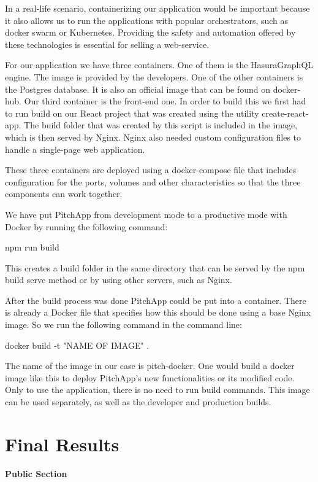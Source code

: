In a real-life scenario, containerizing our application would be important because it also allows us to run the applications with popular orchestrators, such as docker swarm or Kubernetes. Providing the safety and automation offered by these technologies is essential for selling a web-service.

For our application we have three containers. One of them is the HasuraGraphQL engine. The image is provided by the developers. One of the other containers is the Postgres database. It is also an official image that can be found on docker-hub. Our third container is the front-end one. In order to build this we first had to run build on our React project that was created using the utility create-react-app. The build folder that was created by this script is included in the image, which is then served by Nginx. Nginx also needed custom configuration files to handle a single-page web application.

These three containers are deployed using a docker-compose file that includes configuration for the ports, volumes and other characteristics so that the three components can work together.

We have put PitchApp from development mode to a productive mode with Docker by running the following command:

npm run build

This creates a build folder in the same directory that can be served by the npm build serve method or by using other servers, such as Nginx.

After the build process was done PitchApp could be put into a container. There is already a Docker file that specifies how this should be done using a base Nginx image. So we run the following command in the command line:

docker build -t "NAME OF IMAGE" .

The name of the image in our case is pitch-docker.
One would build a docker image like this to deploy PitchApp's new functionalities or its modified code. Only to use the application, there is no need to run build commands.
This image can be used separately, as well as the developer and production builds.


\chapter{Final Results}


\textbf{Public Section}


